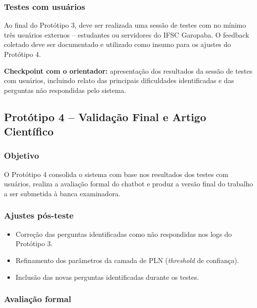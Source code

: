 \subsubsection{Testes com usuários}

Ao final do Protótipo 3, deve ser realizada uma sessão de testes com no mínimo três usuários externos -- estudantes ou servidores do IFSC Garopaba. O feedback coletado deve ser documentado e utilizado como insumo para os ajustes do Protótipo 4.

\textbf{Checkpoint com o orientador:} apresentação dos resultados da sessão de testes com usuários, incluindo relato das principais dificuldades identificadas e das perguntas não respondidas pelo sistema.

\subsection{Protótipo 4 -- Validação Final e Artigo Científico}

\subsubsection{Objetivo}

O Protótipo 4 consolida o sistema com base nos resultados dos testes com usuários, realiza a avaliação formal do chatbot e produz a versão final do trabalho a ser submetida à banca examinadora.

\subsubsection{Ajustes pós-teste}

\begin{itemize}
    \item Correção das perguntas identificadas como não respondidas nos logs do Protótipo 3.
    \item Refinamento dos parâmetros da camada de PLN (\textit{threshold} de confiança).
    \item Inclusão das novas perguntas identificadas durante os testes.
\end{itemize}

\subsubsection{Avaliação formal}


